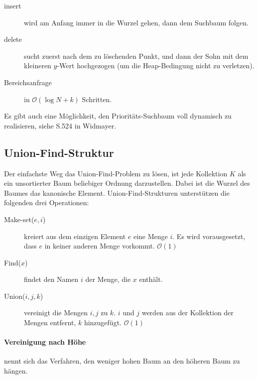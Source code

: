 \documentclass[a4paper, 9pt, DIV=20]{scrartcl}
\newcommand{\Oh}{\mathcal{O}}
\begin{document}
\begin{description}
\item[insert] wird am Anfang immer in die Wurzel gehen, dann dem Suchbaum folgen.
\item[delete] sucht zuerst nach dem zu löschenden Punkt, und dann der Sohn mit dem kleineren $y$-Wert hochgezogen (um die Heap-Bedingung nicht zu verletzen).
\item[Bereichsanfrage] in $\Oh(\log{N}+k)$ Schritten.
\end{description}

Es gibt auch eine Möglichkeit, den Prioritäts-Suchbaum voll dynamisch zu realisieren, siehe S.524 in Widmayer.

\subsection{Union-Find-Struktur}
Der einfachste Weg das Union-Find-Problem zu lösen, ist jede Kollektion $K$ als ein unsortierter Baum beliebiger Ordnung darzustellen. Dabei ist die Wurzel des Baumes das kanonische Element. Union-Find-Strukturen unterstützen die folgenden drei Operationen:
\begin{description}
\item[Make-set($e,i$)] kreiert aus dem einzigen Element $e$ eine Menge $i$. Es wird vorausgesetzt, dass $e$ in keiner anderen Menge vorkommt. $\Oh(1)$
\item[Find($x$)] findet den Namen $i$ der Menge, die $x$ enthält.
\item[Union($i,j,k$)]  vereinigt die Mengen $i, j$ zu $k$. $i$ und $j$ werden aus der Kollektion der Mengen entfernt, $k$ hinzugefügt. $\Oh(1)$
\end{description}

\paragraph{Vereinigung nach Höhe} nennt sich das Verfahren, den weniger hohen Baum an den höheren Baum zu hängen.
\end{document}

